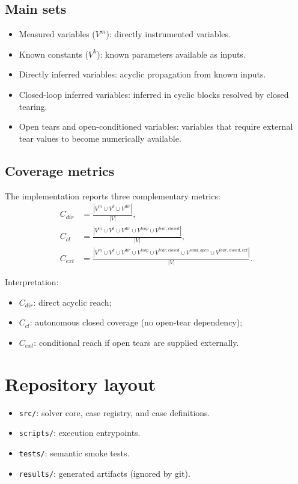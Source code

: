 \documentclass[11pt]{article}
\begin{document}
\subsection{Main sets}
\begin{itemize}
  \item Measured variables ($V^{m}$): directly instrumented variables.
  \item Known constants ($V^{k}$): known parameters available as inputs.
  \item Directly inferred variables: acyclic propagation from known inputs.
  \item Closed-loop inferred variables: inferred in cyclic blocks resolved by
  closed tearing.
  \item Open tears and open-conditioned variables: variables that require
  external tear values to become numerically available.
\end{itemize}

\subsection{Coverage metrics}
The implementation reports three complementary metrics:
\begin{align}
C_{dir} &= \frac{|V^{m} \cup V^{k} \cup V^{dir}|}{|V|}, \\
C_{cl}  &= \frac{|V^{m} \cup V^{k} \cup V^{dir} \cup V^{loop} \cup V^{tear,closed}|}{|V|}, \\
C_{ext} &= \frac{|V^{m} \cup V^{k} \cup V^{dir} \cup V^{loop} \cup V^{tear,closed} \cup V^{cond,open} \cup V^{tear,closed,ext}|}{|V|}.
\end{align}

Interpretation:
\begin{itemize}
  \item $C_{dir}$: direct acyclic reach;
  \item $C_{cl}$: autonomous closed coverage (no open-tear dependency);
  \item $C_{ext}$: conditional reach if open tears are supplied externally.
\end{itemize}

\section{Repository layout}
\begin{itemize}
  \item \texttt{src/}: solver core, case registry, and case definitions.
  \item \texttt{scripts/}: execution entrypoints.
  \item \texttt{tests/}: semantic smoke tests.
  \item \texttt{results/}: generated artifacts (ignored by git).
\end{itemize}
\end{document}
